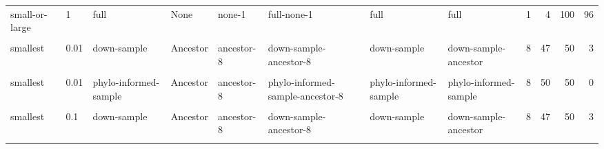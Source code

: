\documentclass[
]{book}
\begin{document}
\begin{table}
\begin{tabular}{l|l|l|l|l|l|l|l|l|r|r|r}
\hline
\cellcolor{gray!6}{small-or-large} & \cellcolor{gray!6}{0.1} & \cellcolor{gray!6}{phylo-informed-sample} & \cellcolor{gray!6}{Ancestor} & \cellcolor{gray!6}{ancestor-8} & \cellcolor{gray!6}{phylo-informed-sample-ancestor-8} & \cellcolor{gray!6}{phylo-informed-sample} & \cellcolor{gray!6}{phylo-informed-sample} & \cellcolor{gray!6}{8} & \cellcolor{gray!6}{12} & \cellcolor{gray!6}{50} & \cellcolor{gray!6}{38}\\
\hline
small-or-large & 1 & full & None & none-1 & full-none-1 & full & full & 1 & 4 & 100 & 96\\
\hline
\cellcolor{gray!6}{smallest} & \cellcolor{gray!6}{0.01} & \cellcolor{gray!6}{down-sample} & \cellcolor{gray!6}{None} & \cellcolor{gray!6}{none-1} & \cellcolor{gray!6}{down-sample-none-1} & \cellcolor{gray!6}{down-sample} & \cellcolor{gray!6}{down-sample} & \cellcolor{gray!6}{1} & \cellcolor{gray!6}{49} & \cellcolor{gray!6}{50} & \cellcolor{gray!6}{1}\\
\hline
smallest & 0.01 & down-sample & Ancestor & ancestor-8 & down-sample-ancestor-8 & down-sample & down-sample-ancestor & 8 & 47 & 50 & 3\\
\hline
\cellcolor{gray!6}{smallest} & \cellcolor{gray!6}{0.01} & \cellcolor{gray!6}{indiv-rand-sample} & \cellcolor{gray!6}{Ancestor} & \cellcolor{gray!6}{ancestor-8} & \cellcolor{gray!6}{indiv-rand-sample-ancestor-8} & \cellcolor{gray!6}{indiv-rand-sample} & \cellcolor{gray!6}{indiv-rand-sample} & \cellcolor{gray!6}{8} & \cellcolor{gray!6}{50} & \cellcolor{gray!6}{50} & \cellcolor{gray!6}{0}\\
\hline
smallest & 0.01 & phylo-informed-sample & Ancestor & ancestor-8 & phylo-informed-sample-ancestor-8 & phylo-informed-sample & phylo-informed-sample & 8 & 50 & 50 & 0\\
\hline
\cellcolor{gray!6}{smallest} & \cellcolor{gray!6}{0.1} & \cellcolor{gray!6}{down-sample} & \cellcolor{gray!6}{None} & \cellcolor{gray!6}{none-1} & \cellcolor{gray!6}{down-sample-none-1} & \cellcolor{gray!6}{down-sample} & \cellcolor{gray!6}{down-sample} & \cellcolor{gray!6}{1} & \cellcolor{gray!6}{47} & \cellcolor{gray!6}{50} & \cellcolor{gray!6}{3}\\
\hline
smallest & 0.1 & down-sample & Ancestor & ancestor-8 & down-sample-ancestor-8 & down-sample & down-sample-ancestor & 8 & 47 & 50 & 3\\
\hline
\cellcolor{gray!6}{smallest} & \cellcolor{gray!6}{0.1} & \cellcolor{gray!6}{indiv-rand-sample} & \cellcolor{gray!6}{Ancestor} & \cellcolor{gray!6}{ancestor-8} & \cellcolor{gray!6}{indiv-rand-sample-ancestor-8} & \cellcolor{gray!6}{indiv-rand-sample} & \cellcolor{gray!6}{indiv-rand-sample} & \cellcolor{gray!6}{8} & \cellcolor{gray!6}{49} & \cellcolor{gray!6}{50} & \cellcolor{gray!6}{1}\\

\end{tabular}
\end{table}
\end{document}
